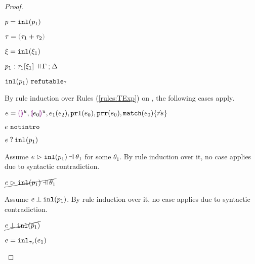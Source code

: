 \begin{proof}
\begin{byCases}
\begin{pfsteps*}
    \item $p=\mathtt{inl}(p_1)$ 
    \item $\tau=\tsum{\tau_1}{\tau_2}$ 
    \item $\xi=\mathtt{inl}(\xi_1)$ 
    \item $\chpattyp{p_1}{\tau_1}{\xi_1}{\Gamma}{\Delta}$  
    \item $\mathtt{inl}(p_1) ~\mathtt{refutable}_?$  
    \end{pfsteps*}
    By rule induction over Rules (\ref{rules:TExp}) on , the following cases apply.
    \begin{byCases}
    \item[\text{(\ref{rule:TEHole}),(\ref{rule:THole}),(\ref{rule:TAp}),(\ref{rule:TPrl}),(\ref{rule:TPrr}),(\ref{rule:TMatchZPre}),(\ref{rule:TMatchNZPre})}]
        \begin{pfsteps*}
        \item $e=\textcolor{violet}{\llparenthesis}\textcolor{violet}{\rrparenthesis}^{u},\textcolor{violet}{\llparenthesis} e_0\textcolor{violet}{\rrparenthesis}^{u},e_1(e_2),\mathtt{prl}(e_0),\mathtt{prr}(e_0),\mathtt{match}(e_0) \{\hat{rs}\}$ 
        \item $e ~\mathtt{notintro}$  
        \item $e \mathbin{?} \mathtt{inl}(p_1)$ 
        \end{pfsteps*}
        Assume $\hpatmatch{e}{\hinlp{p_1}}{\theta_1}$ for some $\theta_1$. By rule induction over it, no case applies due to syntactic contradiction.
        \begin{pfsteps*}
        \item $\cancel{\hpatmatch{e}{\hinlp{p_1}}{\theta_1}}$ 
        \end{pfsteps*}
        Assume $e \mathbin{\bot} \mathtt{inl}(p_1)$. By rule induction over it, no case applies due to syntactic contradiction.
        \begin{pfsteps*}
        \item $\cancel{e \mathbin{\bot} \mathtt{inl}(p_1)}$ 
        \end{pfsteps*}
    \item[\text{(\ref{rule:TInl})}]
        \begin{pfsteps*}
        \item $e=\mathtt{inl}_{\tau_2}({e_1})$ 

\end{pfsteps*}
\end{byCases}
\end{byCases}
\end{proof}

